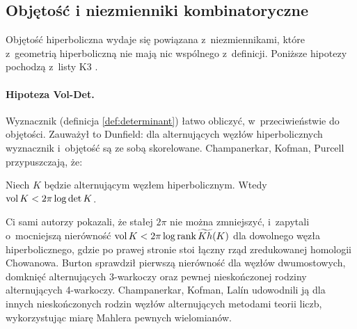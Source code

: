 
\subsection{Objętość i niezmienniki kombinatoryczne}
Objętość hiperboliczna wydaje się powiązana z~niezmiennikami, które z~geometrią hiperboliczną nie mają nic wspólnego z~definicji.
Poniższe hipotezy pochodzą z~listy K3 \cite[problemy 1.27 i~1.29]{baykur2026}.

\paragraph{Hipoteza Vol-Det.}
Wyznacznik (definicja \ref{def:determinant}) łatwo obliczyć, w~przeciwieństwie do objętości.
Zauważył to Dunfield: dla alternujących węzłów hiperbolicznych wyznacznik i~objętość są ze sobą skorelowane.
%
Champanerkar, Kofman, Purcell \cite{champanerkar2016} przypuszczają, że:

\begin{conjecture}
%
    Niech $K$ będzie alternującym węzłem hiperbolicznym.
    Wtedy $\operatorname{vol} K < 2 \pi \log \det K$.
\end{conjecture}

Ci sami autorzy pokazali, że stałej $2\pi$ nie można zmniejszyć, i~zapytali o~mocniejszą nierówność $\operatorname{vol} K < 2 \pi \log \operatorname{rank} \widetilde{Kh}(K)$ dla dowolnego węzła hiperbolicznego, gdzie po prawej stronie stoi łączny rząd zredukowanej homologii Chowanowa.
%
%
%
%
Burton \cite{burton2018} sprawdził pierwszą nierówność dla węzłów dwumostowych, domknięć alternujących 3-warkoczy oraz pewnej nieskończonej rodziny alternujących 4-warkoczy.
Champanerkar, Kofman, Lalín \cite{champanerkar2019} udowodnili ją dla innych nieskończonych rodzin węzłów alternujących metodami teorii liczb, wykorzystując miarę Mahlera pewnych wielomianów.
%
%

